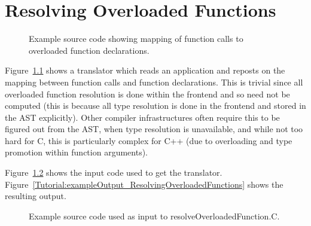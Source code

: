 \chapter{Resolving Overloaded Functions}

\begin{figure}[!h]
{\indent
{\mySmallFontSize


\begin{latexonly}
   
\end{latexonly}

\begin{htmlonly}
   
\end{htmlonly}

}
}
\caption{Example source code showing mapping of function calls to overloaded function declarations.}
\label{Tutorial:exampleResolvingOverloadedFunctions}
\end{figure}

   Figure~\ref{Tutorial:exampleResolvingOverloadedFunctions} shows a translator which
reads an application and reposts on the mapping between function calls and function
declarations.  This is trivial since all overloaded function resolution is done within
the frontend and so need not be computed (this is because all type resolution is done 
in the frontend and stored in the AST explicitly).  Other compiler infrastructures often
require this to be figured out from the AST, when type resolution is unavailable, and
while not too hard for C, this is particularly complex for C++ (due to overloading
and type promotion within function arguments).  

   Figure~\ref{Tutorial:exampleInputCode_ResolvingOverloadedFunctions} shows the
input code used to get the translator.
Figure~\ref{Tutorial:exampleOutput_ResolvingOverloadedFunctions} shows the resulting output.


\begin{figure}[!h]
{\indent
{\mySmallFontSize


\begin{latexonly}
   
\end{latexonly}

\begin{htmlonly}
   
\end{htmlonly}

}
}
\caption{Example source code used as input to resolveOverloadedFunction.C.}
\label{Tutorial:exampleInputCode_ResolvingOverloadedFunctions}
\end{figure}


